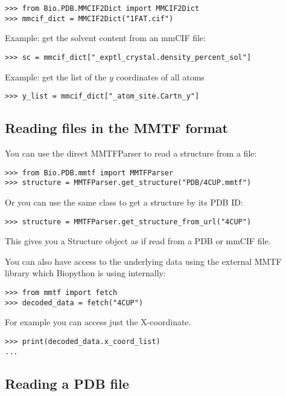 \begin{verbatim}
>>> from Bio.PDB.MMCIF2Dict import MMCIF2Dict
>>> mmcif_dict = MMCIF2Dict("1FAT.cif")
\end{verbatim}

Example: get the solvent content from an mmCIF file:
\begin{verbatim}
>>> sc = mmcif_dict["_exptl_crystal.density_percent_sol"]
\end{verbatim}

Example: get the list of the $y$ coordinates of all atoms
\begin{verbatim}
>>> y_list = mmcif_dict["_atom_site.Cartn_y"]
\end{verbatim}


\subsection{Reading files in the MMTF format}

You can use the direct MMTFParser to read a structure from a file:
\begin{verbatim}
>>> from Bio.PDB.mmtf import MMTFParser
>>> structure = MMTFParser.get_structure("PDB/4CUP.mmtf")
\end{verbatim}

Or you can use the same class to get a structure by its PDB ID:
\begin{verbatim}
>>> structure = MMTFParser.get_structure_from_url("4CUP")
\end{verbatim}

This gives you a Structure object as if read from a PDB or mmCIF file.

You can also have access to the underlying data using the external
MMTF library which Biopython is using internally:
\begin{verbatim}
>>> from mmtf import fetch
>>> decoded_data = fetch("4CUP")
\end{verbatim}
For example you can access just the X-coordinate.
\begin{verbatim}
>>> print(decoded_data.x_coord_list)
...
\end{verbatim}

\subsection{Reading a PDB file}

